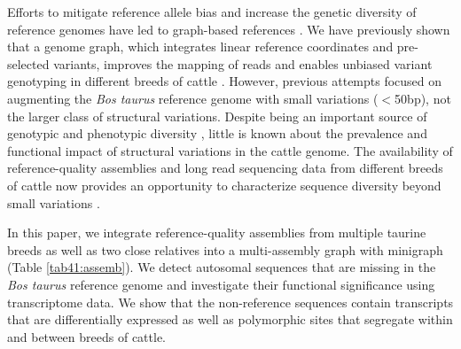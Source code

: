 \documentclass[../main.tex]{subfiles}
\begin{document}
Efforts to mitigate reference allele bias and increase the genetic diversity of reference genomes have led to graph-based references \citep{garrison2018variation,eggertsson2017graphtyper}. We have previously shown that a genome graph, which integrates linear reference coordinates and pre-selected variants, improves the mapping of reads and enables unbiased variant genotyping in different breeds of cattle \citep{crysnanto2019accurate,crysnanto2020bovine}. However, previous attempts focused on augmenting the \emph{Bos taurus} reference genome with small variations ($<$50bp), not the larger class of structural variations. Despite being an important source of genotypic and phenotypic diversity \citep{song2020eight,kehr2017diversity}, little is known about the prevalence and functional impact of structural variations in the cattle genome. The availability of reference-quality assemblies and long read sequencing data from different breeds of cattle now provides an opportunity to characterize sequence diversity beyond small variations \citep{hickey2020genotyping,li2020design}. 

In this paper, we integrate reference-quality assemblies from multiple taurine breeds as well as two close relatives into a multi-assembly graph with minigraph \citep{li2020design} (Table \ref{tab41:assemb}). We detect autosomal sequences that are missing in the \emph{Bos taurus} reference genome and investigate their functional significance using transcriptome data. We show that the non-reference sequences contain transcripts that are differentially expressed as well as polymorphic sites that segregate within and between breeds of cattle.

\bigskip
\end{document}
